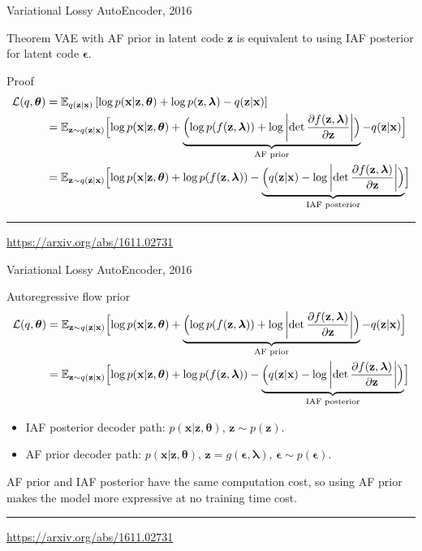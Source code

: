 \documentclass{beamer}
\newcommand{\bx}{\mathbf{x}}
\newcommand{\bz}{\mathbf{z}}
\newcommand{\bepsilon}{\boldsymbol{\epsilon}}
\newcommand{\blambda}{\boldsymbol{\lambda}}
\newcommand{\btheta}{\boldsymbol{\theta}}
\begin{document}
\begin{frame}{Variational Lossy AutoEncoder, 2016}
\begin{block}{Theorem}
VAE with AF prior in latent code $\bz$ is equivalent to using IAF posterior for latent code $\bepsilon$.
\end{block}
\begin{block}{Proof}
\vspace{-0.5cm}
{\footnotesize
\begin{align*}
\mathcal{L}(q, \btheta) &= \mathbb{E}_{q(\bz | \bx)} \left[ \log p(\bx | \bz, \btheta) +  \log p(\bz, \blambda) - q(\bz | \bx) \right] \\
&= \mathbb{E}_{\bz \sim q(\bz | \bx)} \Bigl[ \log p(\bx | \bz, \btheta) + \underbrace{ \Bigl( \log p(f(\bz, \blambda)) + \log \left| \det \frac{\partial f(\bz, \blambda)}{\partial \bz} \right| \Bigr) }_{\text{AF prior}} - q(\bz | \bx) \Bigr] \\
&= \mathbb{E}_{\bz \sim q(\bz | \bx)} \Bigl[ \log p(\bx | \bz, \btheta) +  \log p(f(\bz, \blambda)) - \underbrace{ \Bigl( q(\bz | \bx) - \log \left| \det \frac{\partial f(\bz, \blambda)}{\partial \bz} \right| \Bigr) }_{\text{IAF posterior}} \Bigr]
\end{align*}
}
\end{block}
\vfill
\hrule\medskip
{\scriptsize \href{https://arxiv.org/abs/1611.02731}{https://arxiv.org/abs/1611.02731}}
\end{frame}
\begin{frame}{Variational Lossy AutoEncoder, 2016}
	\begin{block}{Autoregressive flow prior}
		{\footnotesize
		\begin{align*}
			\mathcal{L}(q, \btheta) &= \mathbb{E}_{\bz \sim q(\bz | \bx)} \Bigl[ \log p(\bx | \bz, \btheta) + \underbrace{ \Bigl( \log p(f(\bz, \blambda)) + \log \left| \det \frac{\partial f(\bz, \blambda)}{\partial \bz} \right| \Bigr) }_{\text{AF prior}} - q(\bz | \bx) \Bigr] \\
			&= \mathbb{E}_{\bz \sim q(\bz | \bx)} \Bigl[ \log p(\bx | \bz, \btheta) +  \log p(f(\bz, \blambda)) - \underbrace{ \Bigl( q(\bz | \bx) - \log \left| \det \frac{\partial f(\bz, \blambda)}{\partial \bz} \right| \Bigr) }_{\text{IAF posterior}} \Bigr]
		\end{align*}
		}
	\end{block}
	\begin{itemize}
		\item IAF posterior decoder path: $p(\bx|\bz, \btheta)$, $\bz \sim p(\bz)$.
		\item AF prior decoder path: $p(\bx|\bz, \btheta)$, $\bz = g(\bepsilon, \blambda)$, $\bepsilon \sim p(\bepsilon)$. 
	\end{itemize}
	AF prior and IAF posterior have the same computation cost, so using AF prior makes the model more expressive at no training time cost.
\vfill
\hrule\medskip
{\scriptsize \href{https://arxiv.org/abs/1611.02731}{https://arxiv.org/abs/1611.02731}}
\end{frame}
\end{document}
